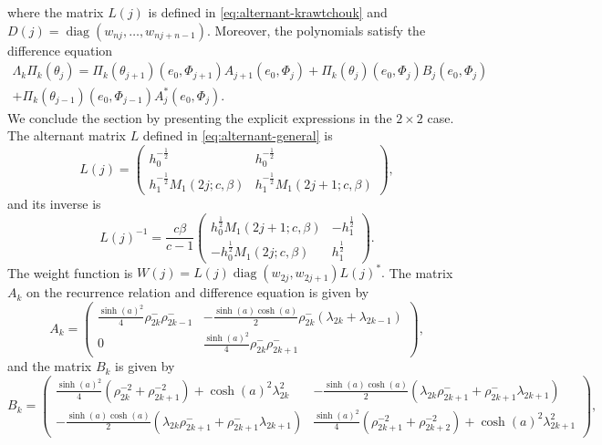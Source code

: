 \documentclass[a4paper,reqno]{amsart}
\DeclareMathOperator{\diag}{diag}
\theoremstyle{definition}
\numberwithin{equation}{section}
\begin{document}
where the matrix $L(j)$ is defined in \eqref{eq:alternant-krawtchouk} and $D(j)=\diag(w_{nj}, \ldots, w_{nj+n-1}).$ Moreover, the polynomials satisfy the difference equation
\begin{multline}
   \Lambda_k\Pi_k(\theta_j)=\Pi_k(\theta_{j+1})(e_0,\Phi_{j+1})A_{j+1}(e_0,\Phi_j)+\Pi_k(\theta_{j})(e_0,\Phi_{j})B_{j}(e_0,\Phi_j)\\+\Pi_k(\theta_{j-1})(e_0,\Phi_{j-1})A_{j}^\ast(e_0,\Phi_j). 
\end{multline}
We conclude the section by presenting the explicit expressions in the $2\times 2$ case. The alternant matrix $L$ defined in \eqref{eq:alternant-general} is 
\begin{equation}
    L(j)=\begin{pmatrix}
h_{0}^{-\frac{1}{2}}&h_{0}^{-\frac{1}{2}}\\
h_{1}^{-\frac{1}{2}}M_1(2j;c,\beta)&h_{1}^{-\frac{1}{2}}M_1(2j+1;c,\beta)
\end{pmatrix},
\end{equation}
and its inverse is 
\begin{equation}
    L(j)^{-1}=\frac{c\beta}{c-1}\begin{pmatrix}
h_{0}^{\frac{1}{2}}M_1(2j+1;c,\beta)&-h_{1}^{\frac{1}{2}}\\
-h_{0}^{\frac{1}{2}}M_1(2j;c,\beta)&h_{1}^{\frac{1}{2}}
\end{pmatrix}.
\end{equation}
The weight function is $W(j)=L(j)\diag(w_{2j},w_{2j+1})L(j)^\ast.$ The matrix $A_k$ on the recurrence relation and difference equation is given by
\begin{equation}
    A_{k}=\begin{pmatrix}
\frac{\sinh(a)^2}{4}\rho^-_{2 k} \rho^-_{2 k-1} & -\frac{\sinh(a)\cosh(a)}{2}\rho^-_{2 k}(\lambda_{2 k}+\lambda_{2 k -1})  
\\
0 & \frac{\sinh(a)^2}{4}\rho^-_{2 k}\rho^-_{2 k +1}
\end{pmatrix},
\end{equation}
and the matrix $B_k$ is given by
\begin{equation}
    B_k=\begin{pmatrix}
\frac{\sinh(a)^2}{4}( \rho_{2 k}^{-2} + \rho _{2 k+1}^{-2}) +\cosh(a)^2 \lambda_{2 k}^{2}& -\frac{\sinh(a)\cosh(a)}{2}(\lambda_{2 k} \rho_{2 k+1}^- + \rho_{2 k+1}^-\lambda_{2 k +1})
\\
- \frac{\sinh(a)\cosh(a)}{2}(\lambda_{2 k} \rho_{2 k+1}^- + \rho_{2 k+1}^-\lambda_{2 k +1}) & \frac{\sinh(a)^2}{4}( \rho_{2 k +1}^{-2}+\rho_{2 k+2}^{-2})+\cosh(a)^{2} \lambda_{2 k +1}^{2}
\end{pmatrix},
\end{equation}
\end{document}
